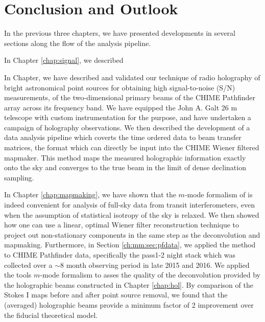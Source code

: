 \chapter{Conclusion and Outlook}
\label{chap:conclusion}

In the previous three chapters, we have presented developments in several sections along the flow of the analysis pipeline.

In Chapter \ref{chap:signal}, we described

In Chapter, we have described and validated our technique of radio holography of bright astronomical point sources for obtaining high signal-to-noise (S/N) measurements, of the two-dimensional primary beams of the CHIME Pathfinder array across its frequency band. We have equipped the John A. Galt 26 m telescope with custom instrumentation for the purpose, and have undertaken a campaign of holography observations. We then described the development of a data analysis pipeline which coverts the time ordered data to beam transfer matrices, the format which can directly be input into the CHIME Wiener filtered mapmaker. This method maps the measured holographic information exactly onto the sky and converges to the true beam in the limit of dense declination sampling.

In Chapter \ref{chap:mapmaking}, we have shown that the $m$-mode formalism of \cite{mmodes1, mmodes2} is indeed convenient for analysis of full-sky data from transit interferometers, even when the assumption of statistical isotropy of the sky is relaxed. We then showed how one can use a linear, optimal Wiener filter reconstruction technique to project out non-stationary components in the same step as the deconvolution and mapmaking. Furthermore, in Section \ref{ch:mm:sec:pfdata}, we applied the method to CHIME Pathfinder data, specifically the pass1-2 night stack which was collected over a $\sim$8 month observing period in late 2015 and 2016. We applied the tools $m$-mode formalism to asses the quality of the deconvolution provided by the holographic beams constructed in Chapter \ref{chap:hol}. By comparison of the Stokes I maps before and after point source removal, we found that the (averaged) holographic beams provide a minimum factor of 2 improvement over the fiducial theoretical model.

